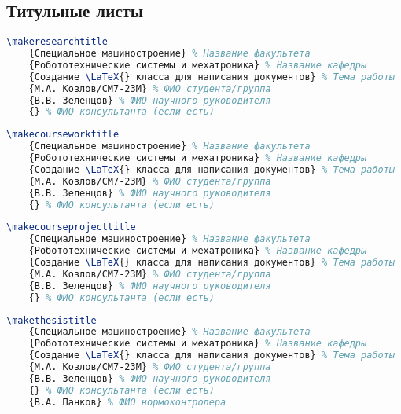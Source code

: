 \begin{appendices}

\chapter{Титульные листы}

\label{appendix:titlepage}

\begin{lstlisting}[language=TeX,
        caption=Код для создания титульного листа НИР,
        label=code:titlepage_makeresearchtitle]
\makeresearchtitle
    {Специальное машиностроение} % Название факультета
    {Робототехнические системы и мехатроника} % Название кафедры
    {Создание \LaTeX{} класса для написания документов} % Тема работы
    {М.А. Козлов/СМ7-23М} % ФИО студента/группа
    {В.В. Зеленцов} % ФИО научного руководителя
    {} % ФИО консультанта (если есть)
\end{lstlisting}

\begin{lstlisting}[language=TeX,
    caption=Код для создания титульного листа КР,
    label=code:titlepage_makecourseworktitle]
\makecourseworktitle
    {Специальное машиностроение} % Название факультета
    {Робототехнические системы и мехатроника} % Название кафедры
    {Создание \LaTeX{} класса для написания документов} % Тема работы
    {М.А. Козлов/СМ7-23М} % ФИО студента/группа
    {В.В. Зеленцов} % ФИО научного руководителя
    {} % ФИО консультанта (если есть)

\end{lstlisting}

\begin{lstlisting}[language=TeX,
    caption=Код для создания титульного листа КП,
    label=code:titlepage_makecourseprojecttitle]
\makecourseprojecttitle
    {Специальное машиностроение} % Название факультета
    {Робототехнические системы и мехатроника} % Название кафедры
    {Создание \LaTeX{} класса для написания документов} % Тема работы
    {М.А. Козлов/СМ7-23М} % ФИО студента/группа
    {В.В. Зеленцов} % ФИО научного руководителя
    {} % ФИО консультанта (если есть)
\end{lstlisting}

\newpage

\begin{lstlisting}[language=TeX,
    caption=Код для создания титульного листа ВКР,
    label=code:titlepage_makethesistitle]
\makethesistitle
    {Специальное машиностроение} % Название факультета
    {Робототехнические системы и мехатроника} % Название кафедры
    {Создание \LaTeX{} класса для написания документов} % Тема работы
    {М.А. Козлов/СМ7-23М} % ФИО студента/группа
    {В.В. Зеленцов} % ФИО научного руководителя
    {} % ФИО консультанта (если есть)
    {В.А. Панков} % ФИО нормоконтролера
\end{lstlisting}


\end{appendices}
